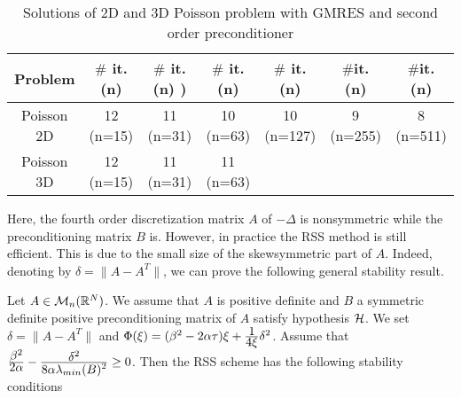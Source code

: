 {\begin{table}[!ht]
\begin{center}
\begin{tabular}{|c||c|c|c|c|c|c|}
\hline 
 Problem & $\#$ it. (n) &  $\#$ it. (n) ) & $\#$ it. (n) & $\#$ it. (n) & $\#$it. (n) & $\#$it. (n)  \\
 \hline
 Poisson 2D & 12 (n=15) &  11  (n=31) &  10 (n=63)  & 10 (n=127) & 9 (n=255) & 8 (n=511)\\
 \hline
 Poisson 3D & 12 (n=15) &  11  (n=31) &  11 (n=63) & & &\\
\hline 
\end{tabular} 
\caption{Solutions of 2D and 3D Poisson problem with GMRES and second order preconditioner}
\label{PrecondPoisson}
\end{center}
\end{table}

Here, the fourth order discretization matrix $A$ of $-\Delta$ is nonsymmetric while the preconditioning matrix $B$ is.
However, in practice the RSS method is still efficient. This is due to the small size of the skewsymmetric part of $A$. Indeed, denoting by $\delta= \parallel A-A^T\parallel$, we can prove the following general stability result.
\begin{theorem_amiens}
Let $A \in {\cal M}_{n}({\mathbb R}^N)$. We assume that $A$ is positive definite and $B$ a symmetric definite positive preconditioning matrix of $A$ satisfy hypothesis ${\cal H}$. We set
$\delta= \parallel A-A^T\parallel$ and $\Phi(\xi)= (\beta^2-2\alpha \tau)\xi + \frac{\textstyle 1} {\textstyle 4\xi}\delta^2$.
Assume that $\frac{\textstyle \beta^2} {\textstyle 2\alpha}-\frac{\textstyle \delta^2} {\textstyle 8\alpha \lambda_{min}(B)^2} \ge 0$. Then the RSS scheme has the following stability conditions
\end{theorem_amiens}}
